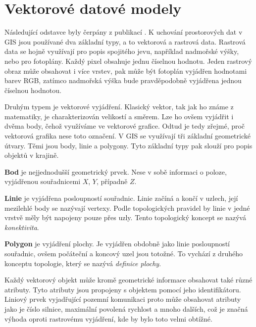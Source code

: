 \chapter{Vektorové datové modely}
\label{chap:vektorovedatovemodely}
Následující odstavce byly čerpány z publikací
\cite{kolar2003geograficke,tucek1997geograficke,vesely2007thesis}. K
uchování prostorových dat v GIS jsou používané dva základní typy, a to
vektorová a rastrová data. Rastrová data se hojně využívají pro popis
spojitého jevu, například nadmořské výšky, nebo pro fotoplány. Každý
pixel obsahuje jednu číselnou hodnotu. Jeden rastrový obraz může
obsahovat i více vrstev, pak může být fotoplán vyjádřen hodnotami
barev RGB, zatímco nadmořská výška bude pravděpodobně vyjádřena jednou
číselnou hodnotou.
	
Druhým typem je vektorové vyjádření. Klasický vektor, tak jak ho známe
z matematiky, je charakterizován velikostí a směrem. Lze ho ovšem
vyjádřit i dvěma body, čehož využíváme ve vektorové grafice. Odtud je
tedy zřejmé, proč vektorová grafika nese toto označení. V GIS se
využívají tři základní geometrické útvary. Těmi jsou body, linie a
polygony. Tyto základní typy pak slouží pro popis objektů v krajině.
	
\textbf{Bod} je nejjednodušší geometrický prvek. Nese v sobě informaci
o poloze, vyjádřenou souřadnicemi $X$, $Y$, případně $Z$.
	
\textbf{Linie} je vyjádřena posloupností souřadnic. Linie začíná a
končí v uzlech, její mezilehlé body se nazývají vertexy. Podle
topologických pravidel by linie v jedné vrstvě měly být napojeny pouze
přes uzly. Tento topologický koncept se nazývá \textit{konektivita}.
	
\textbf{Polygon} je vyjádření plochy. Je vyjádřen obdobně jako linie
posloupností souřadnic, ovšem počáteční a koncový uzel jsou
totožné. To vychází z druhého konceptu topologie, který se nazývá
\textit{definice plochy}.
	
Každý vektorový objekt může kromě geometrické informace obsahovat také
různé atributy. Tyto atributy jsou propojeny s objektem pomocí jeho
identifikátoru. Li\-ni\-o\-vý prvek vyjadřující pozemní komunikaci
proto může obsahovat atributy jako je číslo silnice, maximální
povolená rychlost a mnoho dalších, což je značná výhoda oproti
rastrovému vyjádření, kde by bylo toto velmi obtížné.
	
